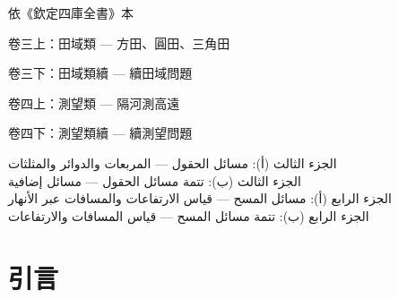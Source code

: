 \documentclass[11pt,a4paper]{article}
\begin{document}
\begin{titlepage}
\begin{center}
\vfill

{\small 依《欽定四庫全書》本}

\vspace{0.2cm}

{\small\color{notecolor} 卷三上：田域類 --- 方田、圓田、三角田}

{\small\color{notecolor} 卷三下：田域類續 --- 續田域問題}

{\small\color{notecolor} 卷四上：測望類 --- 隔河測高遠}

{\small\color{notecolor} 卷四下：測望類續 --- 續測望問題}

\vspace{0.3cm}

{\small\arabicfont\beginR\color{notecolor}
الجزء الثالث (أ): مسائل الحقول --- المربعات والدوائر والمثلثات\\
الجزء الثالث (ب): تتمة مسائل الحقول --- مسائل إضافية\\
الجزء الرابع (أ): مسائل المسح --- قياس الارتفاعات والمسافات عبر الأنهار\\
الجزء الرابع (ب): تتمة مسائل المسح --- قياس المسافات والارتفاعات
\endR}

\end{center}
\end{titlepage}

\tableofcontents
\newpage

\section*{引言}
\end{document}
